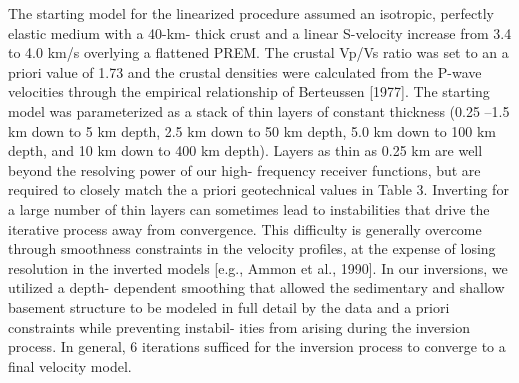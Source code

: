 \documentclass[long]{geophysics}
\begin{document}
The starting model for the linearized procedure
assumed an isotropic, perfectly elastic medium with a 40-km-
thick crust and a linear S-velocity increase from 3.4 to
4.0 km/s overlying a flattened PREM. The crustal Vp/Vs
ratio was set to an a priori value of 1.73 and the crustal
densities were calculated from the P-wave velocities
through the empirical relationship of Berteussen [1977].
The starting model was parameterized as a stack of thin
layers of constant thickness (0.25 –1.5 km down to 5 km
depth, 2.5 km down to 50 km depth, 5.0 km down to 100 km
depth, and 10 km down to 400 km depth). Layers as thin as
0.25 km are well beyond the resolving power of our high-
frequency receiver functions, but are required to closely
match the a priori geotechnical values in Table 3. Inverting
for a large number of thin layers can sometimes lead to
instabilities that drive the iterative process away from
convergence. This difficulty is generally overcome through
smoothness constraints in the velocity profiles, at the
expense of losing resolution in the inverted models [e.g.,
Ammon et al., 1990]. In our inversions, we utilized a depth-
dependent smoothing that allowed the sedimentary and
shallow basement structure to be modeled in full detail by
the data and a priori constraints while preventing instabil-
ities from arising during the inversion process. In general,
6 iterations sufficed for the inversion process to converge to
a final velocity model.



    
\end{document}
